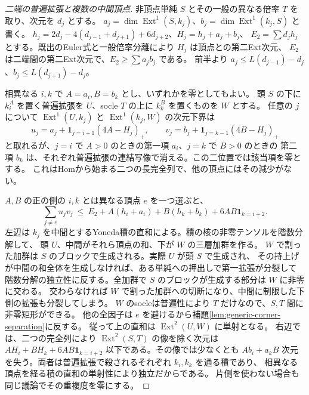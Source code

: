 \begin{proof}[二端の普遍拡張と複数の中間頂点]
非頂点単純 $S$ とその一般の異なる倍率 $T$ を取り、次元を $d_j$ とする。
$a_j=\dim\operatorname{Ext}^1(S,k_j)$、$b_j=\dim\operatorname{Ext}^1(k_j,S)$ と書く。
$h_j=2d_j-4(d_{j-1}+d_{j+1})+6d_{j+2}$、$H_j=h_j+a_j+b_j$、
$E_2=\sum d_jh_j$ とする。既出のEuler式と一般倍率分離により $H_j$ は頂点との第二Ext次元、
$E_2$ は二端間の第二Ext次元で、$E_2\ge\sum a_j b_j$ である。
前半より $a_j\le L(d_{j-1})-d_j$、$b_j\le L(d_{j+1})-d_j$。

相異なる $i,k$ で $A=a_i,B=b_k$ とし、いずれかを零としてもよい。
頭 $S$ の下に $k_i^A$ を置く普遍拡張を $U$、socle $T$ の上に $k_k^B$ を置くものを $W$ とする。
任意の $j$ について $\operatorname{Ext}^1(U,k_j)$ と $\operatorname{Ext}^1(k_j,W)$ の次元下界は
\[
 u_j=a_j+\mathbf1_{j=i+1}(4A-H_j)_+,\qquad
 v_j=b_j+\mathbf1_{j=k-1}(4B-H_j)_+
\]
と取れるが、$j=i$ で $A>0$ のときの第一項 $a_i$、$j=k$ で $B>0$ のときの
第二項 $b_k$ は、それぞれ普遍拡張の連結写像で消える。この二位置では該当項を零とする。
これはHomから始まる二つの長完全列で、他の頂点にはその減少がない。

$A,B$ の正の側の $i,k$ とは異なる頂点 $e$ を一つ選ぶと、
\[
 \sum_{j\ne e}u_jv_j
 \ \le\ E_2+A(h_i+a_i)+B(h_k+b_k)+6AB\mathbf1_{k=i+2}.
\]
左辺は $k_j$ を中間とするYoneda積の直和による。積の核の非零テンソルを階数分解して、
頭 $U$、中間がそれら頂点の和、下が $W$ の三層加群を作る。
$W$ で割った加群は $S$ のブロックで生成される。実際 $U$ が頭 $S$ で生成され、
その持上げが中間の和全体を生成しなければ、ある単純への押出しで第一拡張が分裂して
階数分解の独立性に反する。全加群で $S$ のブロックが生成する部分は $W$ に非零に交わる。
交わらなければ $W$ で割った加群への切断になり、中間に制限した下側の拡張も分裂してしまう。
$W$ のsocleは普遍性により $T$ だけなので、$S,T$ 間に非零矩形ができる。
他の全因子は $e$ を避けるから補題\ref{lem:generic-corner-separation}に反する。
従って上の直和は $\operatorname{Ext}^2(U,W)$ に単射となる。
右辺では、二つの完全列により $\operatorname{Ext}^2(S,T)$ の像を除く次元は
$AH_i+BH_k+6AB\mathbf1_{k=i+2}$ 以下である。その像では少なくとも
$Ab_i+a_kB$ 次元を失う。両者は普遍拡張で殺されるそれぞれ $k_i,k_k$ を通る積であり、
相異なる頂点を経る積の直和の単射性により独立だからである。
片側を使わない場合も同じ議論でその重複度を零にする。
\end{proof}

